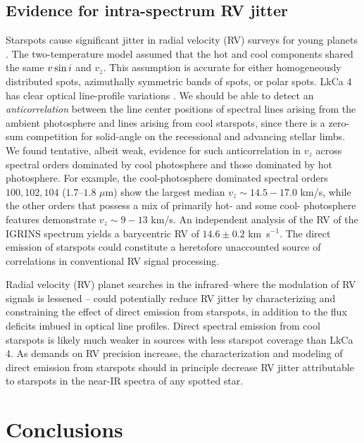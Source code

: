 \documentclass[twocolumn]{emulateapj}%
\begin{document}
\subsection{Evidence for intra-spectrum RV jitter}
Starspots cause significant jitter in radial velocity (RV) surveys for young planets \citep[e.g.][]{donati14, robertson14}.  The two-temperature model assumed that the hot and cool components shared the same $v \sin i$ and $v_z$.  This assumption is accurate for either homogeneously distributed spots, azimuthally symmetric bands of spots, or polar spots.  LkCa 4 has clear optical line-profile variations \citep{nguyen12, donati14}.  We should be able to detect an \emph{anticorrelation} between the line center positions of spectral lines arising from the ambient photosphere and lines arising from cool starspots, since there is a zero-sum competition for solid-angle on the recessional and advancing stellar limbs.  We found tentative, albeit weak, evidence for such anticorrelation in $v_z$ across spectral orders dominated by cool photosphere and those dominated by hot photosphere.  For example, the cool-photosphere dominated spectral orders $100, 102, 104$ ($1.7$--$1.8$ $\mu$m) show the largest median $v_z\sim14.5-17.0$ km/s, while the other orders that possess a mix of primarily hot- and some cool- photosphere features demonstrate $v_z\sim9-13$ km/s.  An independent analysis of the RV of the IGRINS spectrum yields a barycentric RV of $14.6\pm0.2$ km~s$^{-1}$.  The direct emission of starspots could constitute a heretofore unaccounted source of correlations in conventional RV signal processing.

Radial velocity (RV) planet searches in the infrared--where the modulation of RV signals is lessened \citep[\emph{e.g.}][]{prato08,crockett12}-- could potentially reduce RV jitter by characterizing and constraining the effect of direct emission from starspots, in addition to the flux deficits imbued in optical line profiles.  Direct spectral emission from cool starspots is likely much weaker in sources with less starspot coverage than LkCa 4.  As demands on RV precision increase, the characterization and modeling of direct emission from starspots should in principle decrease RV jitter attributable to starspots in the near-IR spectra of any spotted star.


\section{Conclusions}
\end{document}
